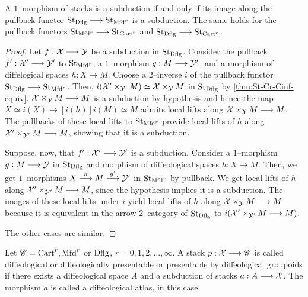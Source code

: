 \documentclass[11pt]{amsart}
\begin{document}
\begin{prop}\label{prop:subd-pullback-st-iff}
A $1$--morphism of stacks is a subduction if and only if its image along the pullback functor
$\St_{\Dflg} \to \St_{\Mfd^r}$ is a subduction. The same holds for the pullback functors
$\St_{\Mfd^r} \to \St_{\Cart^r}$ and $\St_{\Dflg} \to \St_{\Cart^r}$.
\end{prop}
\begin{proof}
Let $f : \mcX \to \mcY$ be a subduction in $\mathrm{St}_{\mathrm{Dflg}}$. Consider the pullback
$f' : \mcX' \to \mcY'$ to $\mathrm{St}_{\mathrm{Mfd}^r}$, a $1$--morphism $g : M \to \mcY'$,
and a morphism of diffelogical spaces $h : X \to M$.
Choose a $2$--inverse $i$ of the pullback functor $\St_{\Dflg} \to \St_{\Mfd^r}$.
Then, $i(\mathcal{X}' \times_{\mathcal{Y}'} M) \simeq \mathcal{X} \times_\mathcal{Y} M$ in $\mathrm{St}_{\mathrm{Dflg}}$ by
\cref{thm:St-Cr-Cinf-equiv}. $\mcX \times_\mcY M \to M$ is a subduction by hypothesis
and hence the map $X \simeq i(X) \to[i(h)] i(M) \simeq M$ admits local lifts
along $\mcX \times_\mcY M \to M$. The pullbacks of these local lifts to $\mathrm{St}_{\mathrm{Mfd}^r}$
provide local lifts of $h$ along $\mcX' \times_{\mcY'} M \to M$, showing that it is a subduction.

Suppose, now, that $f' : \mcX' \to \mcY'$ is a subduction. Consider a $1$--morphism
$g : M \to \mcY$ in $\mathrm{St}_{\mathrm{Dflg}}$ and morphism of diffeological spaces $h : X \to M$.
Then, we get $1$--morphisms $X \to[h] M \to[g'] \mcY'$ in $\mathrm{St}_{\mathrm{Mfd}^r}$ by pullback.
We get local lifts of $h$ along $\mcX' \times_{\mcY'} M \to M$, since the hypothesis implies it
is a subduction. The images of these local lifts under $i$ yield local lifts of
$h$ along $\mcX \times_{\mcY} M \to M$ because it is equivalent in the arrow $2$--category
of $\mathrm{St}_{\mathrm{Dflg}}$ to $i(\mcX' \times_{\mcY'} M \to M)$.

The other cases are similar.
\end{proof}

\begin{defn}\label{defn:dflg-st}
Let $\mathscr{C} = \mathrm{Cart}^r, \mathrm{Mfd}^r$ or $\mathrm{Dflg}$, $r = 0, 1, 2, \dots, \infty$.
A stack $p : \mcX \to \sC$ is called diffeological or diffeologically presentable or presentable by
diffeological groupoids if there exists
a diffeological space $A$ and a subduction of stacks $a : A \to \mcX$.
The morphism $a$ is called a diffeological atlas, in this case.
\end{defn}
\end{document}
